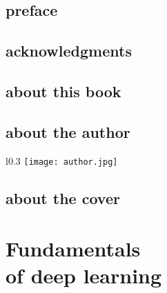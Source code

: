 \documentclass[a4paper,twoside,openany]{book}
\begin{document}
	\thispagestyle{FMPageStyle}	
	\newpage
	
	\pagestyle{FrontMatterMainPages} %
		
	\chapter*{preface} 
	\thispagestyle{FMPageStyle}	
	\kant[1-6]
	
	\chapter*{acknowledgments} 
	\thispagestyle{FMPageStyle}	
	\kant[1]
	
	\chapter*{about this book} 
	\thispagestyle{FMPageStyle}	
	\kant[1-6]
	
	\chapter*{about the author} 
	\thispagestyle{FMPageStyle}	
	\begin{wrapfigure}{l}{0.3\textwidth}
		\centering
		\vspace{-\baselineskip} %
		\texttt{[image: author.jpg]}
	\end{wrapfigure}
	\kant[1]
	
	\chapter*{about the cover} 
	\thispagestyle{FMPageStyle}	
	\kant[1]
	
	\afterpage{\blankpage}
	
	
	\mainmatter
	
	\part[FUNDAMENTALS OF DEEP LEARNING]{Fundamentals \\ of deep learning}	
	\thispagestyle{empty}
	
\end{document}
